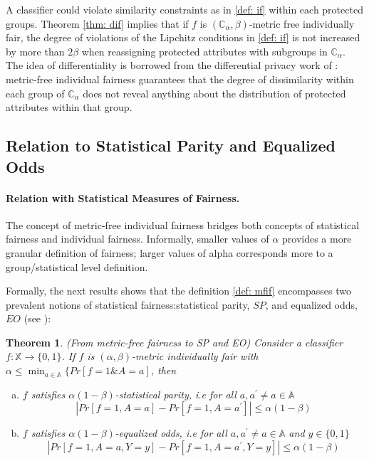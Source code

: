\documentclass{article}
\newtheorem{thm}{Theorem}[section]
\begin{document}
 A classifier could violate similarity constraints as in \ref{def: if} within each protected groups. Theorem \ref{thm: dif} implies that if $f$ is $(\mathbb{C}_{\alpha}, \beta)$-metric free individually fair, the degree of violations of the Lipchitz conditions in \ref{def: if} is not increased by more than $2\beta$ when reassigning protected attributes with subgroups in $\mathbb{C}_{\alpha}$. The idea of differentiality is borrowed from the differential privacy work of :  metric-free individual fairness guarantees that the degree of dissimilarity within each group of $\mathbb{C}_{\alpha}$ does not reveal anything about the distribution of protected attributes within that group. 

\subsection{Relation to Statistical Parity and Equalized Odds}

\paragraph{Relation with Statistical Measures of Fairness.}
The concept of metric-free individual fairness bridges both concepts of statistical fairness and individual fairness.  Informally, smaller values of $\alpha$ provides a more granular definition of fairness; larger values of alpha corresponds more to a group/statistical level definition. 

\bigskip
Formally, the next results shows that the definition \ref{def: mfif} encompasses two prevalent notions of statistical fairness:statistical parity, $SP$, and equalized odds, $EO$ (see \cite{hardt2016equality}):

\begin{thm}(From metric-free fairness to SP and EO)
\label{thm: SP}
Consider a classifier $f: \mathbb{X} \rightarrow \{0, 1\}$.  If $f$ is $(\alpha,\beta)$-metric individually fair with $\alpha \leq \min_{a\in \mathbb{A}}\{Pr[f=1 \& A=a]$, then 
\begin{enumerate}[(a)]
    \item $f$ satisfies $\alpha(1-\beta)$-statistical parity, i.e for all $a, a^{'}\neq a \in \mathbb{A}$
$$ |Pr[f=1, A=a] - Pr[f=1, A=a^{'}]| \leq \alpha(1-\beta)$$
    \item $f$ satisfies $\alpha(1-\beta)$-equalized odds, i.e for all $a, a^{'}\neq a \in \mathbb{A}$ and $y\in\{0,1\}$
$$ |Pr[f=1, A=a, Y=y] - Pr[f=1, A=a^{'}, Y=y]| \leq \alpha(1-\beta)$$
\end{enumerate}
\end{thm}
\end{document}

